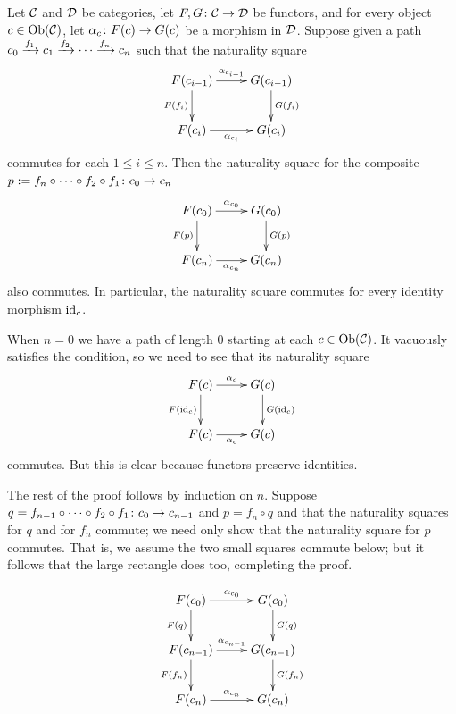 \documentclass[CT4S-EN-RU]{subfiles}
\begin{document}
\begin{exampleRUS}
\end{exampleRUS}

\begin{lemmaENG}\label{lemma:generators for nattrans}
Let $\mathcal{C}$ and $\mathcal{D}$ be categories, let $F,G\colon\mathcal{C}\rightarrow\mathcal{D}$ be functors, and for every object $c\in\textnormal{Ob}(\mathcal{C})$, let $\alpha_c\colon F(c)\rightarrow G(c)$ be a morphism in $\mathcal{D}$. Suppose given a path $c_0\xrightarrow{f_1}c_1\xrightarrow{f_2}\cdots\xrightarrow{f_n} c_n$ such that the naturality square 
$$
\xymatrix{F(c_{i-1})\ar[d]_{F(f_i)}\ar[r]^{\alpha_{c_{i-1}}}&G(c_{i-1})\ar[d]^{G(f_i)}\\F(c_i)\ar[r]_{\alpha_{c_i}}&G(c_i)
}
$$
commutes for each $1\leq i\leq n$. Then the naturality square for the composite $p:=f_n\circ\cdots\circ f_2\circ f_1\colon c_0\rightarrow c_n$ 
$$\xymatrix{F(c_0)\ar[r]^{\alpha_{c_0}}\ar[d]_{F(p)}&G(c_0)\ar[d]^{G(p)}\\F(c_n)\ar[r]_{\alpha_{c_n}}&G(c_n)}
$$
also commutes. In particular, the naturality square commutes for every identity morphism $\textnormal{id}_c$.
\end{lemmaENG}

\begin{lemmaRUS}\label{lemma:generators for nattrans}
\end{lemmaRUS}

\begin{proofENG}
When $n=0$ we have a path of length 0 starting at each $c\in\textnormal{Ob}(\mathcal{C})$. It vacuously satisfies the condition, so we need to see that its naturality square 
$$\xymatrix{F(c)\ar[r]^{\alpha_c}\ar[d]_{F(\id_c)}&G(c)\ar[d]^{G(\id_c)}\\F(c)\ar[r]_{\alpha_c}&G(c)}
$$
commutes. But this is clear because functors preserve identities. 

The rest of the proof follows by induction on $n$. Suppose $q=f_{n-1}\circ\cdots\circ f_2\circ f_1\colon c_0\rightarrow c_{n-1}$ and $p=f_n\circ q$ and that the naturality squares for $q$ and for $f_n$ commute; we need only show that the naturality square for $p$ commutes. That is, we assume the two small squares commute below; but it follows that the large rectangle does too, completing the proof.

$$
\xymatrix{
F(c_0)\ar[r]^{\alpha_{c_0}}\ar[d]_{F(q)}&G(c_0)\ar[d]^{G(q)}\\
F(c_{n-1})\ar[r]^{\alpha_{c_{n-1}}}\ar[d]_{F(f_n)}&G(c_{n-1})\ar[d]^{G(f_n)}\\
F(c_n)\ar[r]^{\alpha_{c_n}}&G(c_n)
}
$$
\end{proofENG}
\end{document}
